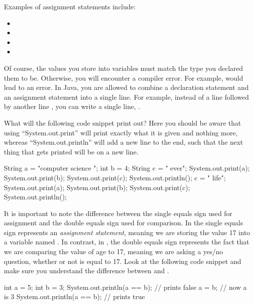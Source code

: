 \noindent Examples of assignment statements include:
\begin{itemize}
 \item {}
 \item {}
 \item {}
 \item {}
\end{itemize}
	Of course, the values you store into variables must match the type you declared them to be. Otherwise, you will encounter a compiler error. For example,  would lead to an error.	
In Java, you are allowed to combine a declaration statement and an assignment statement into a single line. For example, instead of a line  followed by another line , you can write a single line, .	
\begin{example}	
  What will the following code snippet print out?
    Here you should be aware that using ``System.out.print'' will print exactly what it is given and nothing more,
    whereas ``System.out.println'' will add a new line to the end, such that the next thing that gets printed will be on a new line.
  \begin{code}	
    String a = "computer  science ";	
    int b = 4;	
    String c = " ever";	
    System.out.print(a);	
    System.out.print(b);	
    System.out.print(c);	
    System.out.println();	
    c = " life";	
    System.out.print(a);	
    System.out.print(b);	
    System.out.print(c);	
    System.out.println();	
  \end{code}	
\end{example}	
It is important to note the difference between the single equals sign used for assignment and the double equals sign used for comparison. In  the single equals sign represents an \emph{assignment statement}, meaning we are storing the value 17 into a variable named . In contrast, in , the double equals sign represents the fact that we are comparing the value of age to 17, meaning we are asking a yes/no question, whether or not  is equal to 17. Look at the following code snippet and make sure you understand the difference between \ic{=} and \ic{==}.	
\begin{code}	
  int a = 5;	
  int b = 3;	
  System.out.println(a == b);   // prints false	
  a = b;                        // now a is 3	
  System.out.println(a == b);   // prints true	
\end{code}	
